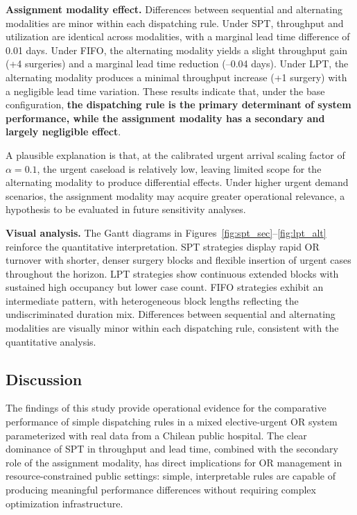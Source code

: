 \documentclass[sn-mathphys-num]{sn-jnl}
\begin{document}
\textbf{Assignment modality effect.} Differences between sequential
and alternating modalities are minor within each dispatching rule.
Under SPT, throughput and utilization are identical across modalities,
with a marginal lead time difference of 0.01 days. Under FIFO,
the alternating modality yields a slight throughput gain (+4 surgeries)
and a marginal lead time reduction (--0.04 days). Under LPT, the
alternating modality produces a minimal throughput increase (+1 surgery)
with a negligible lead time variation. These results indicate that,
under the base configuration, \textbf{the dispatching rule is the
primary determinant of system performance, while the assignment
modality has a secondary and largely negligible effect}.

A plausible explanation is that, at the calibrated urgent arrival
scaling factor of $\alpha = 0.1$, the urgent caseload is relatively
low, leaving limited scope for the alternating modality to produce
differential effects. Under higher urgent demand scenarios, the
assignment modality may acquire greater operational relevance, a
hypothesis to be evaluated in future sensitivity analyses.

\textbf{Visual analysis.} The Gantt diagrams in
Figures~\ref{fig:spt_sec}--\ref{fig:lpt_alt} reinforce the
quantitative interpretation. SPT strategies display rapid OR
turnover with shorter, denser surgery blocks and flexible insertion
of urgent cases throughout the horizon. LPT strategies show
continuous extended blocks with sustained high occupancy but lower
case count. FIFO strategies exhibit an intermediate pattern, with
heterogeneous block lengths reflecting the undiscriminated duration
mix. Differences between sequential and alternating modalities are
visually minor within each dispatching rule, consistent with the
quantitative analysis.

\subsection{Discussion}\label{sec:discussion}

The findings of this study provide operational evidence for the
comparative performance of simple dispatching rules in a mixed
elective-urgent OR system parameterized with real data from a Chilean
public hospital. The clear dominance of SPT in throughput and lead
time, combined with the secondary role of the assignment modality,
has direct implications for OR management in resource-constrained
public settings: simple, interpretable rules are capable of producing
meaningful performance differences without requiring complex
optimization infrastructure.
\end{document}
